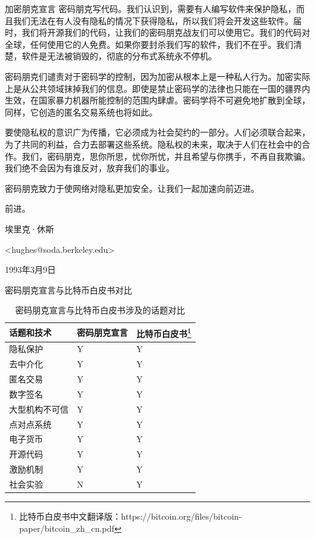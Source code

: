 \documentclass[11pt]{beamer}
\begin{document}
\begin{frame}[allowframebreaks]{加密朋克宣言}
	密码朋克写代码。我们认识到，需要有人编写软件来保护隐私，而且我们无法在有人没有隐私的情况下获得隐私，所以我们将会开发这些软件。届时，我们将开源我们的代码，让我们的密码朋克战友们可以使用它。我们的代码对全球，任何使用它的人免费。如果你要封杀我们写的软件，我们不在乎。{\color{red}我们清楚，软件是无法被销毁的，彻底的分布式系统永不停机}。
	
	密码朋克们谴责对于密码学的控制，因为加密从根本上是一种私人行为。加密实际上是从公共领域抹掉我们的信息。即使是禁止密码学的法律也只能在一国的疆界内生效，在国家暴力机器所能控制的范围内肆虐。{\color{red}密码学将不可避免地扩散到全球，同样，它创造的匿名交易系统也将如此}。
	
	要使隐私权的意识广为传播，它必须成为社会契约的一部分。{\color{red}人们必须联合起来，为了共同的利益，合力去部署这些系统}。隐私权的未来，取决于人们在社会中的合作。我们，密码朋克，思你所思，忧你所忧，并且希望与你携手，不再自我欺骗。我们绝不会因为有谁反对，放弃我们的事业。
	
	密码朋克致力于使网络对隐私更加安全。让我们一起加速向前迈进。
	
	前进。
	
	埃里克·休斯
	
	<hughes@soda.berkeley.edu>
	
	1993年3月9日
	
\end{frame}

\begin{frame}{密码朋克宣言与比特币白皮书对比}
	\begin{table}[]
		\begin{tabular}{@{}lll@{}}
			\toprule
			话题和技术     & 密码朋克宣言 & 比特币白皮书\footnote{比特币白皮书中文翻译版：https://bitcoin.org/files/bitcoin-paper/bitcoin\_zh\_cn.pdf} \\ \midrule
			隐私保护       & Y      & Y      \\
			去中介化      & Y      & Y      \\
			匿名交易      & Y      & Y      \\
			数字签名      & Y      & Y      \\
			大型机构不可信 & Y   & Y \\
			点对点系统     & Y      & Y      \\
			电子货币      & Y      & Y      \\
			开源代码      & Y      & Y      \\
			激励机制      & Y      & Y      \\ 
			社会实验      & N      & Y      \\
			\bottomrule
		\end{tabular}
		\caption{密码朋克宣言与比特币白皮书涉及的话题对比}
		\label{tab:ccb}
	\end{table}
\end{frame}
\end{document}
